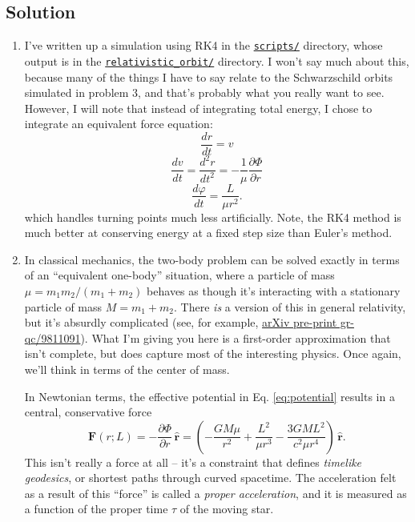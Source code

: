 \documentclass[11pt]{article}
\begin{document}

\vspace{1000pt}


\subsection*{Solution}

\begin{enumerate}

\item I've written up a simulation using RK4 in the \href{https://github.com/alurban/mentoring/blob/master/tidal_disruption/scripts/kepler_orbits_rk4.py}{\texttt{scripts/}} directory, whose output is in the \href{https://github.com/alurban/mentoring/blob/master/tidal_disruption/relativistic_orbit/}{\texttt{relativistic\_orbit/}} directory. I won't say much about this, because many of the things I have to say relate to the Schwarzschild orbits simulated in problem 3, and that's probably what you really want to see. However, I will note that instead of integrating total energy, I chose to integrate an equivalent force equation:
\[ \frac{dr}{dt} = v \]
\[ \frac{dv}{dt} = \frac{d^2 r}{dt^2} = -\frac{1}{\mu}\frac{\partial\Phi}{\partial r} \]
\[ \frac{d\varphi}{dt} = \frac{L}{\mu r^2}. \]
which handles turning points much less artificially. Note, the RK4 method is much better at conserving energy at a fixed step size than Euler's method.

\item In classical mechanics, the two-body problem can be solved exactly in terms of an ``equivalent one-body'' situation, where a particle of mass $\mu = m_1 m_2/(m_1 + m_2)$ behaves as though it's interacting with a stationary particle of mass $M = m_1 + m_2$. There \emph{is} a version of this in general relativity, but it's absurdly complicated (see, for example, \href{https://arxiv.org/pdf/gr-qc/9811091.pdf}{arXiv pre-print gr-qc/9811091}). What I'm giving you here is a first-order approximation that isn't complete, but does capture most of the interesting physics. Once again, we'll think in terms of the center of mass.

\hspace{15pt} In Newtonian terms, the effective potential in Eq. \ref{eq:potential} results in a central, conservative force
\begin{equation}\label{eq:schswarzschild_force}
\mathbf{F}(r; L) = -\frac{\partial\Phi}{\partial r}\,\hat{\mathbf{r}} = \left( -\frac{GM\mu}{r^2} + \frac{L^2}{\mu r^3} - \frac{3GML^2}{c^2\mu r^4} \right) \, \hat{\mathbf{r}}.
\end{equation}
This isn't really a force at all -- it's a constraint that defines \textit{timelike geodesics}, or shortest paths through curved spacetime. The acceleration felt as a result of this ``force'' is called a \textit{proper acceleration}, and it is measured as a function of the proper time $\tau$ of the moving star.


\end{enumerate}
\end{document}

